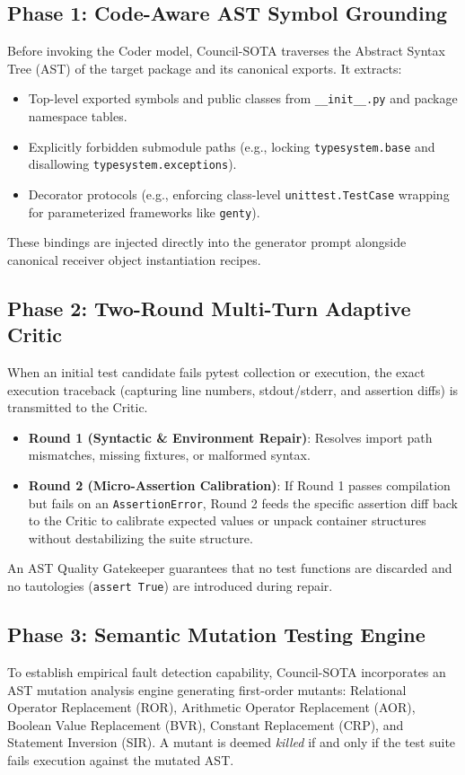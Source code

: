 \documentclass[conference]{IEEEtran}
\begin{document}
\subsection{Phase 1: Code-Aware AST Symbol Grounding}
Before invoking the Coder model, Council-SOTA traverses the Abstract Syntax Tree (AST) of the target package and its canonical exports. It extracts:
\begin{itemize}
    \item Top-level exported symbols and public classes from \texttt{\_\_init\_\_.py} and package namespace tables.
    \item Explicitly forbidden submodule paths (e.g., locking \texttt{typesystem.base} and disallowing \texttt{typesystem.exceptions}).
    \item Decorator protocols (e.g., enforcing class-level \texttt{unittest.TestCase} wrapping for parameterized frameworks like \texttt{genty}).
\end{itemize}
These bindings are injected directly into the generator prompt alongside canonical receiver object instantiation recipes.

\subsection{Phase 2: Two-Round Multi-Turn Adaptive Critic}
When an initial test candidate fails pytest collection or execution, the exact execution traceback (capturing line numbers, stdout/stderr, and assertion diffs) is transmitted to the Critic.
\begin{itemize}
    \item \textbf{Round 1 (Syntactic \& Environment Repair)}: Resolves import path mismatches, missing fixtures, or malformed syntax.
    \item \textbf{Round 2 (Micro-Assertion Calibration)}: If Round 1 passes compilation but fails on an \texttt{AssertionError}, Round 2 feeds the specific assertion diff back to the Critic to calibrate expected values or unpack container structures without destabilizing the suite structure.
\end{itemize}
An AST Quality Gatekeeper guarantees that no test functions are discarded and no tautologies (\texttt{assert True}) are introduced during repair.

\subsection{Phase 3: Semantic Mutation Testing Engine}
To establish empirical fault detection capability, Council-SOTA incorporates an AST mutation analysis engine generating first-order mutants: Relational Operator Replacement (ROR), Arithmetic Operator Replacement (AOR), Boolean Value Replacement (BVR), Constant Replacement (CRP), and Statement Inversion (SIR). A mutant is deemed \textit{killed} if and only if the test suite fails execution against the mutated AST.
\end{document}
